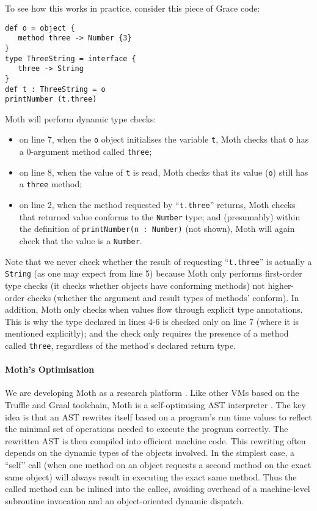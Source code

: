 \documentclass[sigplan,10pt,review,screen]{acmart}\settopmatter{printfolios=true}
\newcommand{\code}[1]{\texttt{#1}}
\begin{document}
To see how this works in practice, consider this piece of Grace code:

\begin{minipage}{\linewidth}
\begin{lstlisting}
def o = object {
   method three -> Number {3}
}
type ThreeString = interface {
   three -> String
}
def t : ThreeString = o
printNumber (t.three)
\end{lstlisting}
\end{minipage}

Moth will perform dynamic type checks:

\begin{itemize}

\item on line 7,
when the \code{o} object initialises the variable \code{t},
Moth checks that \code{o} has a 0-argument method called \code{three};

\item on line 8,
when the value of \code{t} is read,
Moth checks that its value (\code{o}) still has a \code{three} method;

\item on line 2,
when the method requested by ``\code{t.three}'' returns,
Moth checks that returned value conforms to the \code{Number} type;
and (presumably) within the definition of
%
\code{printNumber(n :   Number)}
%
(not shown), Moth will again check that the value is a \code{Number}.
\end{itemize}

Note that we never check
whether the result of requesting ``\code{t.three}'' is actually
a \code{String} (as one may expect from line 5) because Moth only performs first-order type checks
(it checks whether objects have conforming methods) not higher-order
checks (whether the argument and result types of methods' conform). In addition, Moth
only checks when values flow through explicit type annotations.
This is why the type declared in lines 4-6 is checked only on line 7
(where it is mentioned explicitly); and the check only requires the
presence of a method called \code{three}, regardless of the method's
declared return type.

\paragraph{Moth's Optimisation}
We are developing Moth as a
research platform \cite{roberts-and-co-ecoop-2019}. Like other VMs
based on the Truffle and Graal toolchain, Moth is a self-optimising
AST interpreter \cite{Wurthinger:2012:SelfOptAST}. 
The key idea is that an AST rewrites itself based on a program's run time values
to reflect the minimal set of operations needed to execute the program
correctly. The rewritten AST is then compiled into efficient machine
code. This rewriting often depends on the dynamic types of the
objects involved. In the simplest case, a ``self'' call (when one method
on an object requests a second method on the exact same object) will
always result in executing the exact same method. Thus the called method can be inlined into
the callee, avoiding overhead of a machine-level subroutine
invocation and an object-oriented dynamic dispatch.
\end{document}
